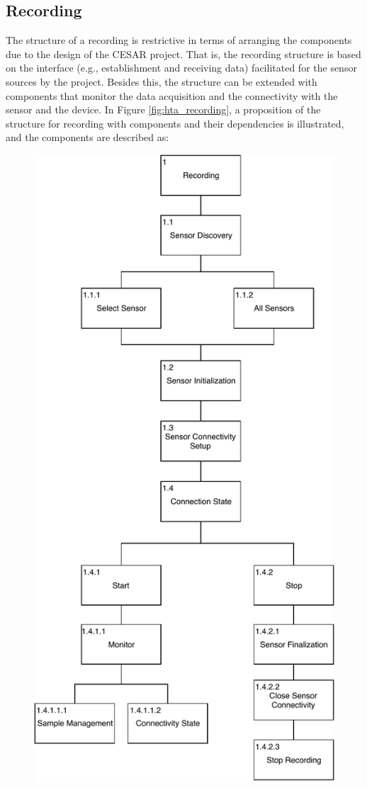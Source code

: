 
\subsection{Recording}\label{soc:recording}
The structure of a recording is restrictive in terms of arranging the components due to the design of the CESAR project. That is, the recording structure is based on the interface (e.g., establishment and receiving data) facilitated for the sensor sources by the project. Besides this, the structure can be extended with components that monitor the data acquisition and the connectivity with the sensor and the device. In Figure \ref{fig:hta_recording}, a proposition of the structure for recording with components and their dependencies is illustrated, and the components are described as:

\begin{figure}
    \centering
    \includegraphics[scale=0.7]{images/Recording_Design.pdf}

\end{figure}
